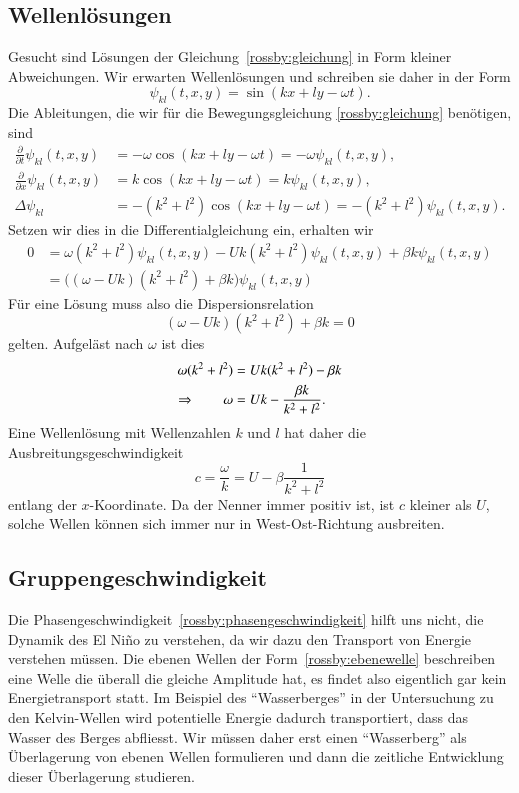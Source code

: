 \subsection{Wellenlösungen\label{subsection:rossby:loesungen}}
Gesucht sind Lösungen der Gleichung~\eqref{rossby:gleichung}
in Form kleiner Abweichungen.
Wir erwarten Wellenlösungen und schreiben sie daher in der Form
\begin{equation}
\psi_{kl}(t,x,y)
=
\sin(kx+ly-\omega t).
\label{rossby:ebenewelle}
\end{equation}
Die Ableitungen, die wir für die Bewegungsgleichung
\eqref{rossby:gleichung} benötigen, sind
\begin{align*}
\frac{\partial}{\partial t} \psi_{kl}(t,x,y)
&=
-\omega \cos(kx+ly-\omega t) = -\omega\psi_{kl}(t,x,y),
\\
\frac{\partial}{\partial x} \psi_{kl}(t,x,y)
&=
k
\cos(kx+ly-\omega t) = k \psi_{kl}(t,x,y),
\\
\Delta\psi_{kl}
&=
-(k^2+l^2)\cos(kx+ly-\omega t)=-(k^2+l^2)\psi_{kl}(t,x,y).
\end{align*}
Setzen wir dies in die Differentialgleichung ein, erhalten wir 
\begin{align*}
0
&=
\omega(k^2+l^2)\psi_{kl}(t,x,y)
-
Uk(k^2+l^2)\psi_{kl}(t,x,y)
+
\beta k\psi_{kl}(t,x,y)
\\
&=
\bigl((\omega-Uk)(k^2+l^2)+\beta k\bigr)\psi_{kl}(t,x,y)
\end{align*}
Für eine Lösung muss also die Dispersionsrelation
\[
(\omega -Uk)(k^2+l^2) +\beta k=0
\]
gelten.
Aufgeläst nach $\omega$ ist dies
\begin{align}
\omega(k^2+l^2)
&=
Uk(k^2+l^2) -\beta k
\notag
\\
\Rightarrow\qquad
\omega
&=
Uk
-
\frac{\beta k}{k^2+l^2}.
\label{rossby:dispersion}
\end{align}
Eine Wellenlösung mit Wellenzahlen $k$ und $l$ hat daher 
die Ausbreitungsgeschwindigkeit 
\begin{equation}
c=\frac{\omega}{k} = U-\beta\frac{1}{k^2+l^2}
\label{rossby:phasengeschwindigkeit}
\end{equation}
entlang der $x$-Koordinate.
Da der Nenner immer positiv ist, ist $c$ kleiner als $U$, solche
Wellen können sich immer nur in West-Ost-Richtung ausbreiten.

\subsection{Gruppengeschwindigkeit}
Die Phasengeschwindigkeit~\eqref{rossby:phasengeschwindigkeit}
hilft uns nicht, die Dynamik des El Niño zu verstehen, da wir dazu
den Transport von Energie verstehen müssen.
Die ebenen Wellen der Form~\eqref{rossby:ebenewelle} beschreiben eine Welle
die überall die gleiche Amplitude hat, es findet also eigentlich gar
kein Energietransport statt.
Im Beispiel des ``Wasserberges'' in der Untersuchung zu den Kelvin-Wellen
wird potentielle Energie dadurch transportiert, dass das Wasser des Berges
abfliesst.
Wir müssen daher erst einen ``Wasserberg'' als Überlagerung von 
ebenen Wellen formulieren und dann die zeitliche Entwicklung dieser
Überlagerung studieren.

